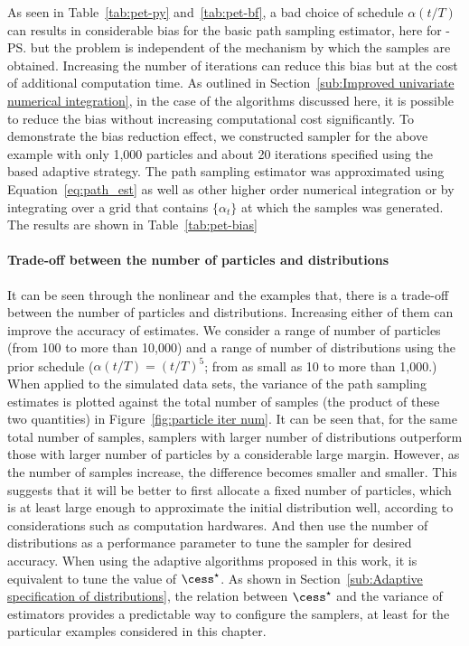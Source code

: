 As seen in Table~\ref{tab:pet-py} and~\ref{tab:pet-bf}, a bad choice of schedule $\alpha(t/T)$ can results in considerable bias for the basic path sampling estimator, here for \smc[2]-\ps but the problem is independent of the mechanism by which the samples are obtained. Increasing the number of iterations can reduce this bias but at the cost of additional computation time. As outlined in Section~\ref{sub:Improved univariate numerical integration}, in the case of the \smc algorithms discussed here, it is possible to reduce the bias without increasing computational cost significantly. To demonstrate the bias reduction effect, we constructed \smc sampler for the above \pet example with only 1,000 particles and about 20 iterations specified using the \cess based adaptive strategy. The path sampling estimator was approximated using Equation~\eqref{eq:path_est} as well as other higher order numerical integration or by integrating over a grid that contains $\{\alpha_t\}$ at which the samples was generated. The results are shown in Table~\ref{tab:pet-bias}



\paragraph{Trade-off between the number of particles and distributions}



It can be seen through the nonlinear \ode and the \pet examples that, there is a trade-off between the number of particles and distributions. Increasing either of them can improve the accuracy of estimates. We consider a range of number of particles (from 100 to more than 10,000) and a range of number of distributions using the prior schedule ($\alpha(t/T) = (t/T)^5$; from as small as 10 to more than 1,000.) When applied to the simulated data sets, the variance of the path sampling estimates is plotted against the total number of samples (the product of these two quantities) in Figure~\ref{fig:particle iter num}. It can be seen that, for the same total number of samples, samplers with larger number of distributions outperform those with larger number of particles by a considerable large margin. However, as the number of samples increase, the difference becomes smaller and smaller. This suggests that it will be better to first allocate a fixed number of particles, which is at least large enough to approximate the initial distribution well, according to considerations such as computation hardwares. And then use the number of distributions as a performance parameter to tune the sampler for desired accuracy. When using the adaptive algorithms proposed in this work, it is equivalent to tune the value of $\cess^\star$. As shown in Section~\ref{sub:Adaptive specification of distributions}, the relation between $\cess^\star$ and the variance of estimators provides a predictable way to configure the samplers, at least for the particular examples considered in this chapter.

